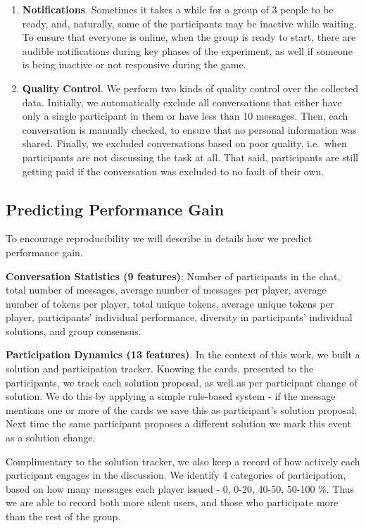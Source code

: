 \documentclass[acmsmall,manuscript,screen]{acmart}
\begin{document}
\begin{enumerate}
\item \textbf{Notifications}.
Sometimes it takes a while for a group of 3 people to be ready, and, naturally, some of the participants may be inactive while waiting. To ensure that everyone is online, when the group is ready to start, there are audible notifications during key phases of the experiment, as well if someone is being inactive or not responsive during the game.   

\item \textbf{Quality Control}. We perform two kinds of quality control over the collected data. Initially, we automatically exclude all conversations that either have only a single participant in them or have less than 10 messages. Then, each conversation is manually checked, to ensure that no personal information was shared. Finally, we excluded conversations based on poor quality, i.e.\ when participants are not discussing the task at all. That said, participants are still getting paid if the conversation was excluded to no fault of their own.
\end{enumerate}


\subsection{Predicting Performance Gain}
\label{app:reproducibility_performance_gain}
To encourage reproducibility we will describe in details how we predict performance gain. 

\textbf{Conversation Statistics (9 features)}: Number of participants in the chat, total number of messages, average number of messages per player, average number of tokens per player, total unique tokens, average unique tokens per player, participants' individual performance, diversity in participants' individual solutions, and group consensus.

\textbf{Participation Dynamics (13 features)}. In the context of this work, we built a solution and participation tracker. Knowing the cards, presented to the participants, we track each solution proposal, as well as per participant change of solution. We do this by applying a simple rule-based system - if the message mentions one or more of the cards we save this as participant's solution proposal. Next time the same participant proposes a different solution we mark this event as a solution change.

Complimentary to the solution tracker, we also keep a record of how actively each participant engages in the discussion. We identify 4 categories of participation, based on how many messages each player issued - 0, 0-20, 40-50, 50-100 \%. Thus we are able to record both more silent users, and those who participate more than the rest of the group.
\end{document}
